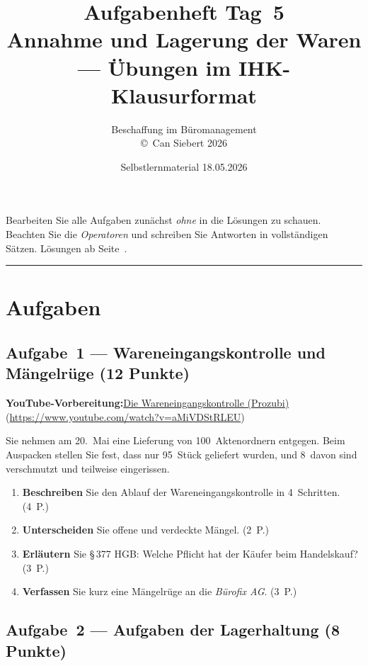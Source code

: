 \documentclass[11pt, a4paper]{article}
\title{\vspace*{-1.5cm}\Huge\bfseries\color{bfwPrimaryDark}Aufgabenheft Tag~5\\[0.4em]
  \large\color{bfwInkSoft}\textnormal{Annahme und Lagerung der Waren --- Übungen im IHK-Klausurformat}}
\author{\textsf{Beschaffung im Büromanagement}\\
\textsf{\small\copyright\ Can Siebert\,\textperiodcentered\,2026}}
\date{Selbstlernmaterial \textperiodcentered{} 18.05.2026}
\begin{document}
\maketitle
\thispagestyle{empty}

\begin{merksatz}[title={\bfseries So nutzen Sie dieses Aufgabenheft}]
Bearbeiten Sie alle Aufgaben zunächst \emph{ohne} in die Lösungen zu schauen.
Beachten Sie die \emph{Operatoren} und schreiben Sie Antworten in vollständigen Sätzen.
Lösungen ab Seite~\pageref{loesungen}.
\end{merksatz}

\tableofcontents
\vspace{1em}
\hrule

\section{Aufgaben}

\subsection*{Aufgabe~1 --- Wareneingangskontrolle und Mängelrüge (12 Punkte)}

\noindent\textbf{\color{bfwAccent}YouTube-Vorbereitung:}\enspace \href{https://www.youtube.com/watch?v=aMiVDStRLEU}{Die Wareneingangskontrolle (Prozubi)} (\url{https://www.youtube.com/watch?v=aMiVDStRLEU})

\medskip
Sie nehmen am 20.~Mai eine Lieferung von 100~Aktenordnern entgegen. Beim Auspacken
stellen Sie fest, dass nur 95~Stück geliefert wurden, und 8~davon sind verschmutzt
und teilweise eingerissen.

\begin{enumerate}[label=(\alph*)]
  \item \textbf{Beschreiben} Sie den Ablauf der Wareneingangskontrolle in 4~Schritten. \hfill (4~P.)
  \item \textbf{Unterscheiden} Sie offene und verdeckte Mängel. \hfill (2~P.)
  \item \textbf{Erläutern} Sie §\,377 HGB: Welche Pflicht hat der Käufer beim Handelskauf? \hfill (3~P.)
  \item \textbf{Verfassen} Sie kurz eine Mängelrüge an die \emph{Bürofix AG}. \hfill (3~P.)
\end{enumerate}

\subsection*{Aufgabe~2 --- Aufgaben der Lagerhaltung (8 Punkte)}
\end{document}
